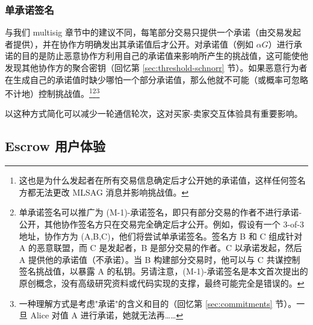 \subsubsection*{单承诺签名}

与我们 multisig 章节中的建议不同，每笔部分交易只提供一个承诺（由交易发起者提供），并在协作方明确发出其承诺值后才公开。对承诺值（例如 $\alpha G$）进行承诺的目的是防止恶意协作方利用自己的承诺值来影响所产生的挑战值，这可能使他发现其他协作方的聚合密钥（回忆第 \ref{sec:threshold-schnorr} 节）。如果恶意行为者在生成自己的承诺值时缺少哪怕一个部分承诺值，那么他就不可能（或概率可忽略不计地）控制挑战值。\footnote{这也是为什么发起者在所有交易信息确定后才公开她的承诺值，这样任何签名方都无法更改 MLSAG 消息并影响挑战值。}\footnote{单承诺签名可以推广为 (M-1)-承诺签名，即只有部分交易的作者不进行承诺-公开，其他协作签名方只在交易完全确定后才公开。例如，假设有一个 3-of-3 地址，协作方为 (A,B,C)，他们将尝试单承诺签名。签名方 B 和 C 组成针对 A 的恶意联盟，而 C 是发起者，B 是部分交易的作者。C 以承诺发起，然后 A 提供他的承诺值（不承诺）。当 B 构建部分交易时，他可以与 C 共谋控制签名挑战值，以暴露 A 的私钥。另请注意，(M-1)-承诺签名是本文首次提出的原创概念，没有高级研究资料或代码实现的支撑，最终可能完全是错误的。}\footnote{一种理解方式是考虑"承诺"的含义和目的（回忆第 \ref{sec:commitments} 节）。一旦 Alice 对值 A 进行承诺，她就无法再……}

以这种方式简化可以减少一轮通信轮次，这对买家-卖家交互体验具有重要影响。


\subsection{Escrow 用户体验}
\label{subsec:escrowed-marketplace-escrow-user-experience}

